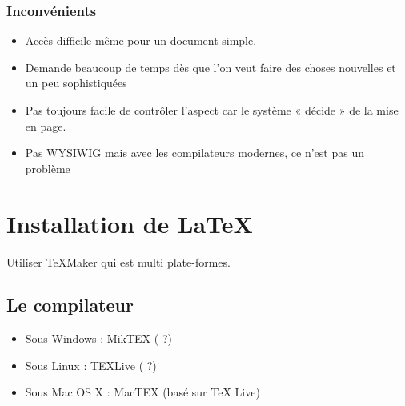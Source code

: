 \documentclass[a4paper, french]{article}
\begin{document}
\subsubsection{Inconvénients} 

\begin{itemize}
   \item Accès difficile même pour un document simple.
   \item Demande beaucoup de temps dès que l’on veut faire des choses nouvelles et un peu sophistiquées
   \item Pas toujours facile de contrôler l’aspect car le système « décide » de la mise en page. 
   \item Pas WYSIWIG mais avec les compilateurs modernes, ce n’est pas un problème
\end{itemize}



\section{Installation de \LaTeX} 
 
 Utiliser TeXMaker qui est multi plate-formes.
 
\subsection{Le compilateur} 

\begin{itemize}
   \item Sous Windows 	: MikTEX ( ?)
   \item Sous Linux 	: TEXLive ( ?)
   \item Sous Mac OS X	: MacTEX (basé sur TeX Live)
\end{itemize}


\end{document}
